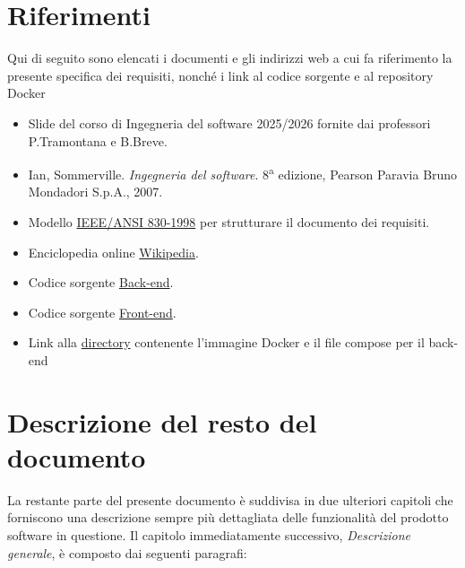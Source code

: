 \section{Riferimenti}
Qui di seguito sono elencati i documenti e gli indirizzi web a cui fa riferimento la presente specifica dei requisiti, nonché i 
link al codice sorgente e al repository Docker
\begin{itemize}
    \item Slide del corso di Ingegneria del software 2025/2026 fornite dai professori P.Tramontana e B.Breve.
    \item Ian, Sommerville. \textit{Ingegneria del software}. 8\textsuperscript{a} edizione, Pearson Paravia Bruno Mondadori S.p.A., 2007.
    \item Modello \href{https://ieeexplore.ieee.org/document/720574}{IEEE/ANSI 830-1998} per strutturare il documento dei requisiti.
    \item Enciclopedia online \href{https://it.wikipedia.org/wiki/Pagina_principale}{Wikipedia}. 
    \item Codice sorgente \href{https://github.com/ubiestubi/ProgettoIngSoft}{Back-end}.
    \item Codice sorgente \href{https://github.com/GiandomenicoIameo/BugBoard26/tree/main}{Front-end}.
    \item Link alla \href{https://communitystudentiunina-my.sharepoint.com/:f:/g/personal/u_musto_studenti_unina_it/IgArB_oG9uFMQ5LTcVQUakrmAcshTORCLn3K1V4J0z0thnY?e=ka4gLm}{directory} contenente l'immagine Docker e il file compose per il back-end
\end{itemize}

\section{Descrizione del resto del documento}
La restante parte del presente documento è suddivisa in due ulteriori capitoli che forniscono una descrizione sempre più dettagliata delle funzionalità del prodotto software in questione.
Il capitolo immediatamente successivo, \textit{Descrizione generale}, è composto dai seguenti paragrafi:

